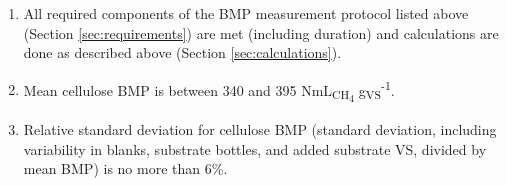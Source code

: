 \documentclass[]{article}
\begin{document}
\begin{enumerate}
  \item All required components of the BMP measurement protocol listed above (Section \ref{sec:requirements}) are met (including duration) and calculations are done as described above (Section \ref{sec:calculations}).
  \item Mean cellulose BMP is between 340 and 395 NmL\textsubscript{CH\textsubscript{4}} g\textsubscript{VS}\textsuperscript{-1}.
  \item Relative standard deviation for cellulose BMP (standard deviation, including variability in blanks, substrate bottles, and added substrate VS, divided by mean BMP) is no more than 6\%.
\end{enumerate}


\end{document}
